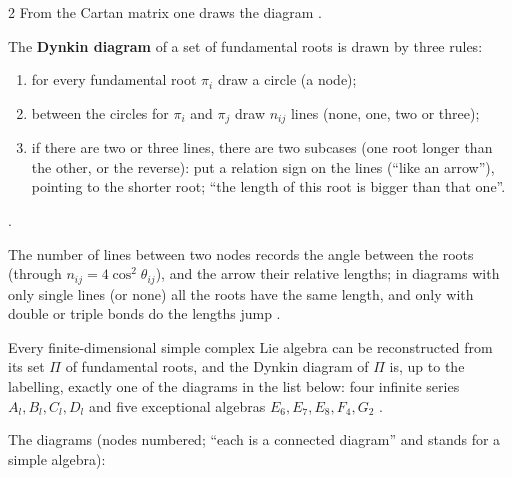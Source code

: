 \begin{paracol}{2}
From the Cartan matrix one draws the diagram .
\begin{definition}\label{def:cl-dynkin}
The \textbf{Dynkin diagram} of a set of fundamental roots is drawn by three rules:
\begin{enumerate}
  \item for every fundamental root $\pi_i$ draw a circle (a node);
  \item between the circles for $\pi_i$ and $\pi_j$ draw $n_{ij}$ lines (none, one, two or three);
  \item if there are two or three lines, there are two subcases (one root longer than the other, or the reverse): put a relation sign on the lines (``like an arrow''), pointing to the shorter root; ``the length of this root is bigger than that one''.
\end{enumerate}
     .
\end{definition}
The number of lines between two nodes records the angle between the roots (through $n_{ij}=4\cos^2\theta_{ij}$), and the arrow their relative lengths; in diagrams with only single lines (or none) all the roots have the same length, and only with double or triple bonds do the lengths jump  .
\begin{theorem}\label{thm:cl-classification}
Every finite-dimensional simple complex Lie algebra can be reconstructed from its set $\Pi$ of fundamental roots, and the Dynkin diagram of $\Pi$ is, up to the labelling, exactly one of the diagrams in the list below: four infinite series $A_l,B_l,C_l,D_l$ and five exceptional algebras $E_6,E_7,E_8,F_4,G_2$   .
\end{theorem}
The diagrams (nodes numbered; ``each is a connected diagram'' and stands for a simple algebra):


\end{paracol}
